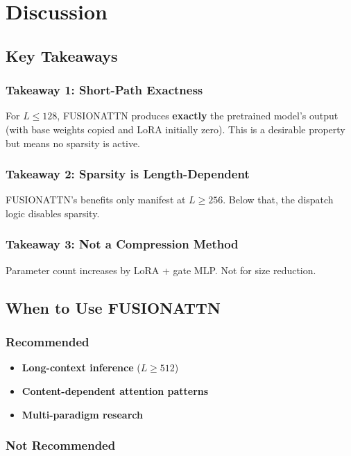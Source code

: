 \section{Discussion}

\subsection{Key Takeaways}

\subsubsection{Takeaway 1: Short-Path Exactness}

For $L \leq 128$, FUSIONATTN produces \textbf{exactly} the pretrained model's 
output (with base weights copied and LoRA initially zero). This is a 
desirable property but means no sparsity is active.

\subsubsection{Takeaway 2: Sparsity is Length-Dependent}

FUSIONATTN's benefits only manifest at $L \geq 256$. Below that, the 
dispatch logic disables sparsity.

\subsubsection{Takeaway 3: Not a Compression Method}

Parameter count increases by LoRA + gate MLP. Not for size reduction.

\subsection{When to Use FUSIONATTN}

\subsubsection{Recommended}

\begin{itemize}
\item \textbf{Long-context inference} ($L \geq 512$)
\item \textbf{Content-dependent attention patterns}
\item \textbf{Multi-paradigm research}

\end{itemize}
\subsubsection{Not Recommended}

